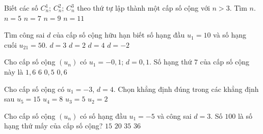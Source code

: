 \begin{ex}%
	Biết các số $C_n^1$; $C_n^2$; $C_n^3$ theo thứ tự lập thành một cấp số cộng với $n > 3$. Tìm $n.$
	\choice
	{$n=5$}
	{\True $n=7$}
	{$n=9$}
	{$n=11$}
\end{ex}
\begin{ex}%
	Tìm công sai $d$ của cấp số cộng hữu hạn biết số hạng đầu $u_1=10$ và số hạng cuối $u_{21}=50$.
	\choice
	{$d=3$}
	{\True $d=2$}
	{$d=4$}
	{$d=-2$}
\end{ex}
\begin{ex}%
	Cho cấp số cộng $\left(u_n \right)$ có $u_1=-0{,}1$; $d=0{,}1$. Số hạng thứ $7$ của cấp số cộng này là
	\choice
	{$1{,}6$}
	{$6$}
	{\True $0{,}5$}
	{$0{,}6$}
	\loigiai{
		\[u_7=-0{,}1+6\cdot0{,}1=0{,}5.\]
	}
\end{ex}
\begin{ex}%
	Cho cấp số cộng có $u_1=-3$, $d=4$. Chọn khẳng định đúng trong các khẳng định sau
	\choice
	{$u_5=15$}
	{$u_4=8$}
	{\True $u_3=5$}
	{$u_2=2$}
\end{ex}
\begin{ex}%
	Cho cấp số cộng $\left(u_n \right)$ có số hạng đầu $u_1=-5$ và công sai $d=3$. Số $100$ là số hạng thứ mấy của cấp số cộng?
	\choice
	{$15$}
	{$20$}
	{$35$}
	{\True $36$}
\end{ex}

